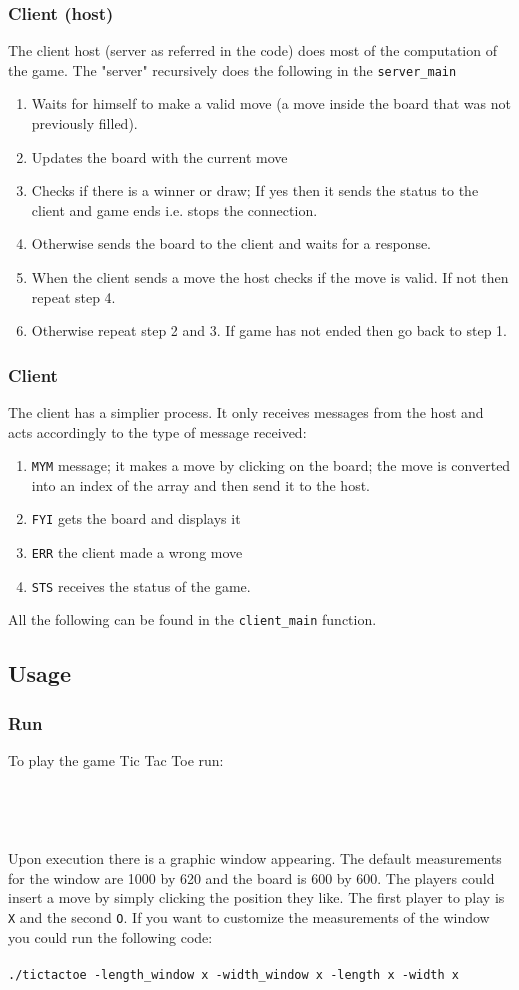 \documentclass{article}
\begin{document}
\subsubsection{Client (host)}
The client host (server as referred in the code) does most of the computation of the game.  The "server" recursively does the following in the \texttt{server\_main}
\begin{enumerate}
\item Waits for himself to make a valid move (a move inside the board that was not previously filled).
\item Updates the board with the current move
\item Checks if there is a winner or draw; If yes then it sends the status to the client and game ends i.e. stops the connection.
\item Otherwise sends the board to the client and waits for a response.
\item When the client sends a move the host checks if the move is valid. If not then repeat step 4. 
\item Otherwise repeat step 2 and 3. If game has not ended then go back to step 1.
\end{enumerate}
\subsubsection{Client }
The client has a simplier process. It only receives messages from the host and acts accordingly to the type of message received:
\begin{enumerate}
\item \texttt{MYM} message; it makes a move by clicking on the board; the move is converted into an index of the array and then send it to the host.
\item \texttt{FYI} gets the board and displays it
\item \texttt{ERR} the client made a wrong move
\item \texttt{STS} receives the status of the game. 
\end{enumerate}
All the following can be found in the \texttt{client\_main} function.
\subsection{Usage}
\subsubsection{Run}
To play the game Tic Tac Toe run:\\\\
\\
\\\\
Upon execution there is a graphic window appearing. The default measurements for the window are 1000 by 620 and the board is 600 by 600. The players could insert a move by simply clicking the position they like. The first player to play is \texttt{X} and the second \texttt{O}. If you want to customize the measurements of the window you could run the following code:\\\\
\texttt{./tictactoe -length\_window x -width\_window x -length x -width x}
  
\end{document}
